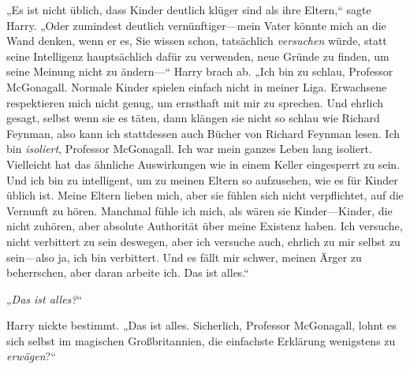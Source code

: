 „Es ist nicht üblich, dass Kinder deutlich klüger sind als ihre Eltern,“ sagte Harry. „Oder zumindest deutlich vernünftiger—mein Vater könnte mich an die Wand denken, wenn er es, Sie wissen schon, tatsächlich \emph{versuchen} würde, statt seine Intelligenz hauptsächlich dafür zu verwenden, neue Gründe zu finden, um seine Meinung nicht zu ändern—“ Harry brach ab. „Ich bin zu schlau, Professor McGonagall. Normale Kinder spielen einfach nicht in meiner Liga. Erwachsene respektieren mich nicht genug, um ernsthaft mit mir zu sprechen. Und ehrlich gesagt, selbst wenn sie es täten, dann klängen sie nicht so schlau wie Richard Feynman, also kann ich stattdessen auch Bücher von Richard Feynman lesen. Ich bin \emph{isoliert}, Professor McGonagall. Ich war mein ganzes Leben lang isoliert. Vielleicht hat das ähnliche Auswirkungen wie in einem Keller eingesperrt zu sein. Und ich bin zu intelligent, um zu meinen Eltern so aufzusehen, wie es für Kinder üblich ist. Meine Eltern lieben mich, aber sie fühlen sich nicht verpflichtet, auf die Vernunft zu hören. Manchmal fühle ich mich, als wären sie Kinder—Kinder, die nicht zuhören, aber absolute Authorität über meine Existenz haben. Ich versuche, nicht verbittert zu sein deswegen, aber ich versuche auch, ehrlich zu mir selbst zu sein—also ja, ich bin verbittert. Und es fällt mir schwer, meinen Ärger zu beherrschen, aber daran arbeite ich. Das ist alles.“

„\emph{Das ist alles?}“

Harry nickte bestimmt. „Das ist alles. Sicherlich, Professor McGonagall, lohnt es sich selbst im magischen Großbritannien, die einfachste Erklärung wenigstens zu \emph{erwägen}?“

\later

